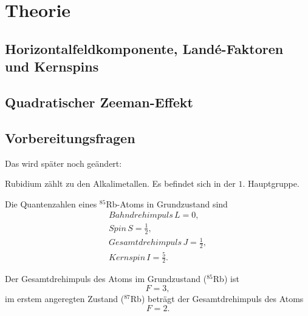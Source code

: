 
\section{Theorie}
\label{sec:Theorie}

\subsection{Horizontalfeldkomponente, Landé-Faktoren und Kernspins}

\subsection{Quadratischer Zeeman-Effekt}

\subsection{Vorbereitungsfragen}
Das wird später noch geändert:

Rubidium zählt zu den Alkalimetallen. Es befindet sich in der $\num{1}$. Hauptgruppe. 

Die Quantenzahlen eines $^{85}$Rb-Atoms in Grundzustand sind
\begin{align*}
    Bahndrehimpuls \, L = \num{0}, \\
    Spin \, S = \frac{1}{2}, \\
    Gesamtdrehimpuls \, J = \frac{1}{2}, \\
    Kernspin \, I = \frac{5}{2}. %
\end{align*}

Der Gesamtdrehimpuls des Atoms im Grundzustand ($^{85}$Rb) ist
\begin{equation*}
    F = \num{3},
\end{equation*}
im erstem angeregten Zustand ($^{87}$Rb) beträgt der Gesamtdrehimpuls des Atoms %
\begin{equation*}
    F = \num{2}.
\end{equation*} %

